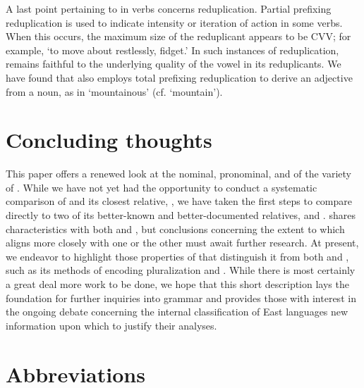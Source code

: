 \documentclass[output=paper]{LSP/langsci}
\begin{document}
 A last point pertaining to  in  verbs concerns reduplication. Partial prefixing reduplication is used to indicate intensity or iteration of action in some verbs.  When this occurs, the maximum size of the reduplicant appears to be CVV; for example,  `to move about restlessly, fidget.' In such instances of reduplication,  remains faithful to the underlying quality of the vowel in its reduplicants. We have found that  also employs total prefixing reduplication to derive an adjective from a noun, as in  `mountainous' (cf.  `mountain'). 
 
 \section{Concluding thoughts}
 
 This paper offers a renewed look at the nominal, pronominal, and  of the  variety of . While we have not yet had the opportunity to conduct a systematic comparison of  and its closest relative, , we have taken the first steps to compare  directly to two of its better-known and better-documented relatives,  and .  shares characteristics with both  and , but conclusions concerning the extent to which  aligns more closely with one or the other must await further research. At present, we endeavor to highlight those properties of  that distinguish it from both  and , such as its methods of encoding pluralization and . While there is most certainly a great deal more work to be done, we hope that this short description lays the foundation for further inquiries into  grammar and provides those with interest in the ongoing debate concerning the internal classification of East  languages new information upon which to justify their analyses.
 
\section*{Abbreviations}
\end{document}
